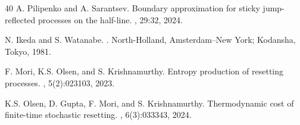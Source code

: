 \documentclass[11pt,a4paper]{article}
\theoremstyle{definition}
\theoremstyle{remark}
\begin{document}
\begin{thebibliography}{40}
	A. Pilipenko and A. Sarantsev.
	\newblock Boundary approximation for sticky jump-reflected processes on the half-line.
	, 29:32, 2024.
	
	N. Ikeda and S. Watanabe.
	.
	\newblock North-Holland, Amsterdam–New York; Kodansha, Tokyo, 1981.
	
	F. Mori, K.S. Olsen, and S. Krishnamurthy.
	\newblock Entropy production of resetting processes.
	, 5(2):023103, 2023.
	
	K.S. Olsen, D. Gupta, F. Mori, and S. Krishnamurthy.
	\newblock Thermodynamic cost of finite-time stochastic resetting.
	, 6(3):033343, 2024.
	
\end{thebibliography}
\end{document}
